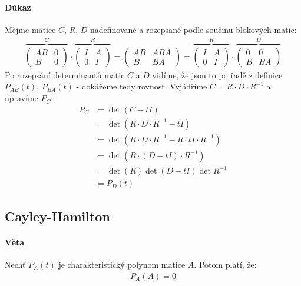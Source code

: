 \documentclass[a4paper,10pt]{article}
\begin{document}
\paragraph{Důkaz}
Mějme matice $C$, $R$, $D$ nadefinované a rozepsané podle součinu blokových matic:
\begin{align}
	\overbrace{
	\left( \begin{matrix}
		AB & 0 \\ B & 0
	\end{matrix}\right)}^C
	\cdot
	\overbrace{
	\left( \begin{matrix}
		I & A \\ 0 & I
	\end{matrix}\right)}^R
	=
	\left( \begin{matrix}
		AB & ABA \\ B & BA
	\end{matrix}\right)
	=
	\overbrace{
	\left( \begin{matrix}
		I & A \\ 0 & I
	\end{matrix}\right)}^R
	\cdot
	\overbrace{
	\left( \begin{matrix}
		0 & 0 \\ B & BA
	\end{matrix}\right)}^D
\end{align}
Po rozepsání determinantů matic $C$ a $D$ vidíme, že jsou to po řadě z definice
$P_{AB}(t)$, $P_{BA}(t)$ - dokážeme tedy rovnost. Vyjádříme $C = R \cdot D \cdot R^{-1}$ a upravíme
$P_C$:
\begin{align}
	P_C &= \det(C - tI) \\
	&= \det( R \cdot D \cdot R^{-1} - tI) \\
	&= \det( R \cdot D \cdot R^{-1} - R \cdot tI \cdot R^{-1} ) \\
	&= \det( R\cdot (D - tI)\cdot R^{-1}) \\
	&= \det(R) \det( D-tI) \det R^{-1} \\
	&= P_D(t)
\end{align}

\subsection{Cayley-Hamilton}
\setcounter{equation}{0}
\paragraph{Věta}
Nechť $P_A(t)$ je charakteristický polynom matice $A$. Potom platí, že:
\begin{align*}
	P_A(A) = 0
\end{align*}
\end{document}
